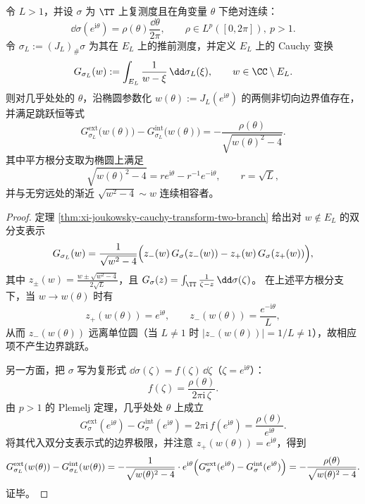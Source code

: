 \begin{theorem}\label{thm:xi-joukowsky-ellipse-plemelj-jump}
令 \(L>1\)，并设 \(\sigma\) 为 \(\TT\) 上复测度且在角变量 \(\theta\) 下绝对连续：
\[
\dd\sigma(e^{\mathrm{i}\theta})=\rho(\theta)\frac{\dd\theta}{2\pi},
\qquad \rho\in L^p([0,2\pi]),\ p>1.
\]
令 \(\sigma_L:=(J_L)_\#\sigma\) 为其在 \(E_L\) 上的推前测度，并定义 \(E_L\) 上的 Cauchy 变换
\[
G_{\sigma_L}(w):=\int_{E_L}\frac{1}{w-\xi}\,\dd\sigma_L(\xi),\qquad w\in\CC\setminus E_L.
\]
则对几乎处处的 \(\theta\)，沿椭圆参数化 \(w(\theta):=J_L(e^{\mathrm{i}\theta})\) 的两侧非切向边界值存在，并满足跳跃恒等式
\[
\boxed{\;
G_{\sigma_L}^{\mathrm{ext}}\!\bigl(w(\theta)\bigr)-G_{\sigma_L}^{\mathrm{int}}\!\bigl(w(\theta)\bigr)
=-\frac{\rho(\theta)}{\sqrt{w(\theta)^2-4}}.\;}
\]
其中平方根分支取为椭圆上满足
\[
\sqrt{w(\theta)^2-4}=r e^{\mathrm{i}\theta}-r^{-1}e^{-\mathrm{i}\theta},
\qquad r=\sqrt{L},
\]
并与无穷远处的渐近 \(\sqrt{w^2-4}\sim w\) 连续相容者。
\end{theorem}
\begin{proof}
定理 \ref{thm:xi-joukowsky-cauchy-transform-two-branch} 给出对 \(w\notin E_L\) 的双分支表示
\[
G_{\sigma_L}(w)=\frac{1}{\sqrt{w^2-4}}
\Bigl(z_-(w)\,G_\sigma(z_-(w)) - z_+(w)\,G_\sigma(z_+(w))\Bigr),
\]
其中 \(z_\pm(w)=\frac{w\pm\sqrt{w^2-4}}{2\sqrt{L}}\)，且
\(
G_\sigma(z)=\int_{\TT}\frac{1}{\zeta-z}\,\dd\sigma(\zeta)
\)。
在上述平方根分支下，当 \(w\to w(\theta)\) 时有
\[
z_+(w(\theta))=e^{\mathrm{i}\theta},
\qquad
z_-(w(\theta))=\frac{e^{-\mathrm{i}\theta}}{L},
\]
从而 \(z_-(w(\theta))\) 远离单位圆（当 \(L\neq 1\) 时 \(|z_-(w(\theta))|=1/L\neq 1\)），故相应项不产生边界跳跃。

另一方面，把 \(\sigma\) 写为复形式 \( \dd\sigma(\zeta)=f(\zeta)\,\dd\zeta \)（\(\zeta=e^{\mathrm{i}\theta}\)）：
\[
f(\zeta)=\frac{\rho(\theta)}{2\pi\mathrm{i}\,\zeta}.
\]
由 \(p>1\) 的 Plemelj 定理，几乎处处 \(\theta\) 上成立
\[
G_\sigma^{\mathrm{ext}}(e^{\mathrm{i}\theta})-G_\sigma^{\mathrm{int}}(e^{\mathrm{i}\theta})
=2\pi\mathrm{i}\,f(e^{\mathrm{i}\theta})
=\frac{\rho(\theta)}{e^{\mathrm{i}\theta}}.
\]
将其代入双分支表示式的边界极限，并注意 \(z_+(w(\theta))=e^{\mathrm{i}\theta}\)，得到
\[
G_{\sigma_L}^{\mathrm{ext}}(w(\theta))-G_{\sigma_L}^{\mathrm{int}}(w(\theta))
=-\frac{1}{\sqrt{w(\theta)^2-4}}\cdot e^{\mathrm{i}\theta}\Bigl(G_\sigma^{\mathrm{ext}}(e^{\mathrm{i}\theta})-G_\sigma^{\mathrm{int}}(e^{\mathrm{i}\theta})\Bigr)
=-\frac{\rho(\theta)}{\sqrt{w(\theta)^2-4}}.
\]
证毕。
\end{proof}

